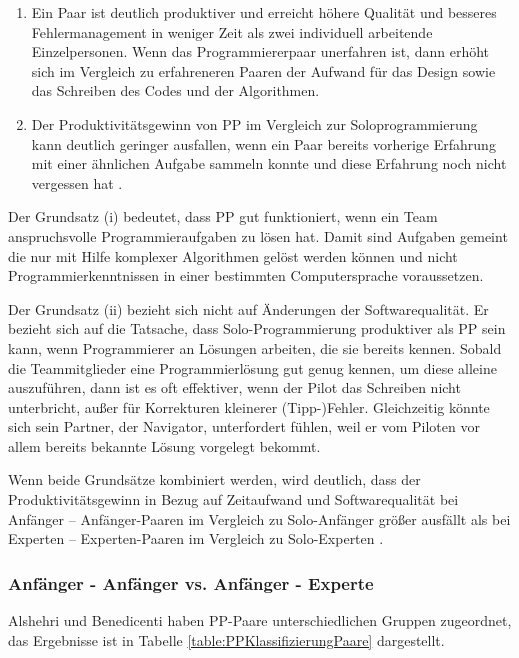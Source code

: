 \begin{enumerate}[i]
\item Ein Paar ist deutlich produktiver und erreicht höhere Qualität und besseres Fehlermanagement in weniger Zeit als zwei individuell arbeitende Einzelpersonen. Wenn das Programmiererpaar unerfahren ist, dann erhöht sich im Vergleich zu erfahreneren Paaren der Aufwand für das Design sowie das Schreiben des Codes und der Algorithmen\cite{Lui2006PairExpertexpert}.
\item Der Produktivitätsgewinn von PP im Vergleich zur Soloprogrammierung kann deutlich geringer ausfallen, wenn ein Paar bereits vorherige Erfahrung mit einer ähnlichen Aufgabe sammeln konnte und diese Erfahrung noch nicht vergessen hat \cite{Lui2006PairExpertexpert}.
\end{enumerate}


Der Grundsatz (i) bedeutet, dass PP gut funktioniert, wenn ein Team anspruchsvolle Programmieraufgaben zu lösen hat. Damit sind Aufgaben gemeint die nur mit Hilfe komplexer Algorithmen gelöst werden können und nicht Programmierkenntnissen in einer bestimmten Computersprache voraussetzen.

Der Grundsatz (ii) bezieht sich nicht auf Änderungen der Softwarequalität. Er bezieht sich auf die Tatsache, dass Solo-Programmierung produktiver als PP sein kann, wenn Programmierer an Lösungen arbeiten, die sie bereits kennen. Sobald die Teammitglieder eine Programmierlösung gut genug kennen, um diese alleine auszuführen, dann ist es oft effektiver, wenn der Pilot das Schreiben nicht unterbricht, außer für Korrekturen kleinerer (Tipp-)Fehler. Gleichzeitig könnte sich sein Partner, der Navigator, unterfordert fühlen, weil er vom Piloten vor allem bereits bekannte Lösung vorgelegt bekommt.

Wenn beide Grundsätze kombiniert werden, wird deutlich, dass der Produktivitätsgewinn in Bezug auf Zeitaufwand und Softwarequalität bei Anfänger – Anfänger-Paaren im Vergleich zu Solo-Anfänger größer ausfällt als bei Experten – Experten-Paaren im Vergleich zu Solo-Experten \cite{Lui2006PairExpertexpert}.


\subsubsection*{Anfänger - Anfänger vs. Anfänger - Experte} Alshehri und Benedicenti \cite{Alshehri2014RankingProgramming} haben PP-Paare unterschiedlichen Gruppen zugeordnet, das Ergebnisse ist in Tabelle \ref{table:PPKlassifizierungPaare} dargestellt.



